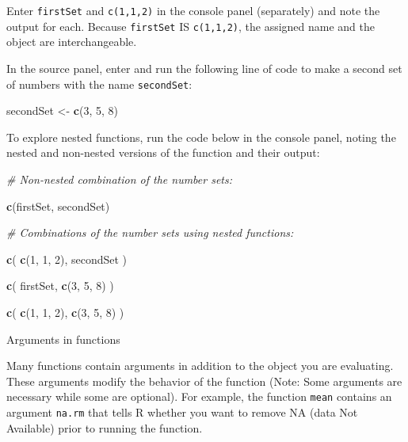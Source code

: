 \documentclass[]{article}
\newenvironment{Shaded}{\begin{snugshade}}{\end{snugshade}}
\newcommand{\KeywordTok}[1]{\textcolor[rgb]{0.13,0.29,0.53}{\textbf{#1}}}
\newcommand{\DecValTok}[1]{\textcolor[rgb]{0.00,0.00,0.81}{#1}}
\newcommand{\StringTok}[1]{\textcolor[rgb]{0.31,0.60,0.02}{#1}}
\newcommand{\CommentTok}[1]{\textcolor[rgb]{0.56,0.35,0.01}{\textit{#1}}}
\newcommand{\NormalTok}[1]{#1}
\begin{document}
 Enter \texttt{firstSet} and \texttt{c(1,1,2)} in the console panel
(separately) and note the output for each. Because \texttt{firstSet} IS
\texttt{c(1,1,2)}, the assigned name and the object are interchangeable.

 In the source panel, enter and run the following line of code to make a
second set of numbers with the name \texttt{secondSet}:

\begin{Shaded}
\begin{Highlighting}[]
\NormalTok{secondSet <-}\StringTok{ }
\StringTok{  }\KeywordTok{c}\NormalTok{(}\DecValTok{3}\NormalTok{, }\DecValTok{5}\NormalTok{, }\DecValTok{8}\NormalTok{)}
\end{Highlighting}
\end{Shaded}

 To explore nested functions, run the code below in the console panel,
noting the nested and non-nested versions of the function and their
output:

\begin{Shaded}
\begin{Highlighting}[]
\CommentTok{# Non-nested combination of the number sets:}

\KeywordTok{c}\NormalTok{(firstSet, secondSet)}

\CommentTok{# Combinations of the number sets using nested functions:}

\KeywordTok{c}\NormalTok{(}
  \KeywordTok{c}\NormalTok{(}\DecValTok{1}\NormalTok{, }\DecValTok{1}\NormalTok{, }\DecValTok{2}\NormalTok{),}
\NormalTok{  secondSet}
\NormalTok{)}

\KeywordTok{c}\NormalTok{(}
\NormalTok{  firstSet,}
  \KeywordTok{c}\NormalTok{(}\DecValTok{3}\NormalTok{, }\DecValTok{5}\NormalTok{, }\DecValTok{8}\NormalTok{)}
\NormalTok{)}

\KeywordTok{c}\NormalTok{(}
  \KeywordTok{c}\NormalTok{(}\DecValTok{1}\NormalTok{, }\DecValTok{1}\NormalTok{, }\DecValTok{2}\NormalTok{),}
  \KeywordTok{c}\NormalTok{(}\DecValTok{3}\NormalTok{, }\DecValTok{5}\NormalTok{, }\DecValTok{8}\NormalTok{)}
\NormalTok{)}
\end{Highlighting}
\end{Shaded}

Arguments in functions

Many functions contain arguments in addition to the object you are
evaluating. These arguments modify the behavior of the function (Note:
Some arguments are necessary while some are optional). For example, the
function \texttt{mean} contains an argument \texttt{na.rm} that tells R
whether you want to remove NA (data Not Available) prior to running the
function.
\end{document}
